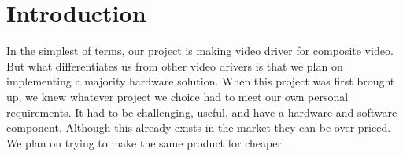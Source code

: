 \section{Introduction}

In the simplest of terms, our project is making video driver for composite
video. But what differentiates us from other video drivers is that we plan on 
implementing a majority hardware solution. When this project was first 
brought up, we knew whatever project we choice had to meet our own personal
requirements. It had to be challenging, useful, and have a hardware and 
software component. Although this already exists in the market they can be over
priced. We plan on trying to make the same product for cheaper.  
